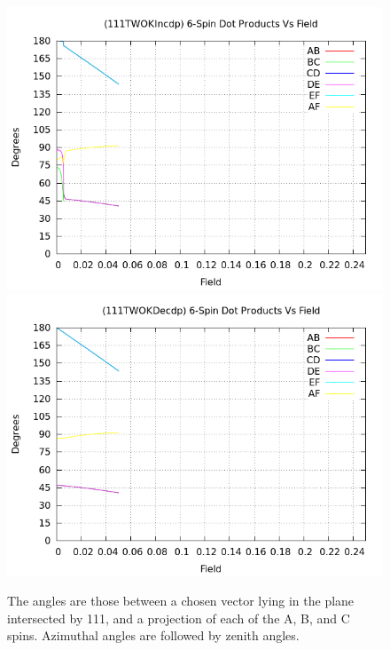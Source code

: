 \documentclass{article}
\begin{document}
\begin{figure}
\centering
\includegraphics[scale=0.27]{HVariedData/Pictures/111TWOKIncdp.png}
\includegraphics[scale=0.27]{HVariedData/Pictures/111TWOKDecdp.png}
\caption{The angles are those between a chosen vector lying in the plane intersected by 111,
and a projection of each of the A, B, and C spins. Azimuthal angles are followed by zenith angles.}
\end{figure}
\clearpage
\end{document}
